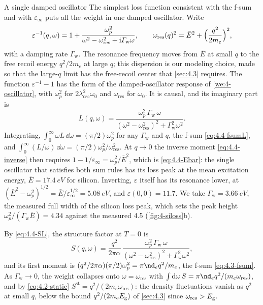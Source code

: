 \begin{workedexample}{A single damped oscillator}\label{we:4-oscillatorL}
The simplest loss function consistent with the f-sum and with $\varepsilon_\infty$ puts all the weight in one damped oscillator. Write
\begin{equation*}
  \varepsilon^{-1}(q,\omega) = 1 + \frac{\omega_p^2}{\omega^2 - \omega_{\mathrm{res}}^2 + \mathrm{i}\varGamma_{\mathrm{w}}\omega}, \qquad
  \omega_{\mathrm{res}}(q)^2 = \bar E^2 + \Bigl(\frac{q^2}{2m_e}\Bigr)^2 ,
\end{equation*}
with a damping rate $\varGamma_{\mathrm{w}}$. The resonance frequency moves from $\bar E$ at small $q$ to the free recoil energy $q^2/2m_e$ at large $q$; this dispersion is our modeling choice, made so that the large-$q$ limit has the free-recoil center that \cref{sec:4.3} requires. The function $\varepsilon^{-1} - 1$ has the form of the damped-oscillator response of \cref{we:4-oscillator}, with $\omega_p^2$ for $2\lambda_{\mathrm{osc}}^2\omega_0$ and $\omega_{\mathrm{res}}$ for $\omega_0$. It is causal, and its imaginary part is
\begin{equation*}
  L(q,\omega) = \frac{\omega_p^2\,\varGamma_{\mathrm{w}}\,\omega}{(\omega^2 - \omega_{\mathrm{res}}^2)^2 + \varGamma_{\mathrm{w}}^2\omega^2} .
\end{equation*}
Integrating, $\int_0^\infty\omega L\,\dd\omega = (\pi/2)\omega_p^2$ for any $\varGamma_{\mathrm{w}}$ and $q$, the f-sum \cref{eq:4.4-fsumL}, and $\int_0^\infty(L/\omega)\,\dd\omega = (\pi/2)\omega_p^2/\omega_{\mathrm{res}}^2$. At $q \to 0$ the inverse moment \cref{eq:4.4-inverse} then requires $1 - 1/\varepsilon_\infty = \omega_p^2/\bar E^2$, which is \cref{eq:4.4-Ebar}: the single oscillator that satisfies both sum rules has its loss peak at the mean excitation energy, $\bar E = \SI{17.4}{eV}$ for silicon. Inverting, $\varepsilon$ itself has its resonance lower, at $(\bar E^2 - \omega_p^2)^{1/2} = \bar E/\varepsilon_\infty^{1/2} = \SI{5.08}{eV}$, and $\varepsilon(0,0) = 11.7$. We take $\varGamma_{\mathrm{w}} = \SI{3.66}{eV}$, the measured full width of the silicon loss peak, which sets the peak height $\omega_p^2/(\varGamma_{\mathrm{w}}\bar E) = 4.34$ against the measured 4.5 (\cref{fig:4-siloss}b).

By \cref{eq:4.4-SL}, the structure factor at $T = 0$ is
\begin{equation*}
  S(q,\omega) = \frac{q^2}{2\pi\alpha}\,\frac{\omega_p^2\,\varGamma_{\mathrm{w}}\,\omega}{(\omega^2 - \omega_{\mathrm{res}}^2)^2 + \varGamma_{\mathrm{w}}^2\omega^2} ,
\end{equation*}
and its first moment is $(q^2/2\pi\alpha)(\pi/2)\omega_p^2 = \pi\nd_eq^2/m_e$, the f-sum \cref{eq:4.3-fsum}. As $\varGamma_{\mathrm{w}} \to 0$, the weight collapses onto $\omega = \omega_{\mathrm{res}}$ with $\int\dd\omega\,S = \pi\nd_eq^2/(m_e\omega_{\mathrm{res}})$, and by \cref{eq:4.2-static} $S^{\mathrm{st}} = q^2/(2m_e\omega_{\mathrm{res}})$: the density fluctuations vanish as $q^2$ at small $q$, below the bound $q^2/(2m_eE_{\mathrm{g}})$ of \cref{sec:4.3} since $\omega_{\mathrm{res}} > E_{\mathrm{g}}$.


\end{workedexample}
